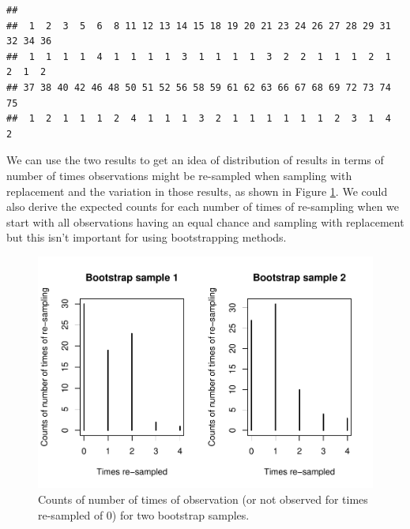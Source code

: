 \documentclass[]{book}
\newenvironment{Shaded}{\begin{snugshade}}{\end{snugshade}}
\newcommand{\KeywordTok}[1]{\textcolor[rgb]{0.13,0.29,0.53}{\textbf{#1}}}
\newcommand{\StringTok}[1]{\textcolor[rgb]{0.31,0.60,0.02}{#1}}
\newcommand{\OperatorTok}[1]{\textcolor[rgb]{0.81,0.36,0.00}{\textbf{#1}}}
\newcommand{\NormalTok}[1]{#1}
\begin{document}
\begin{Shaded}
\end{Shaded}

\begin{verbatim}
## 
##  1  2  3  5  6  8 11 12 13 14 15 18 19 20 21 23 24 26 27 28 29 31 32 34 36 
##  1  1  1  1  4  1  1  1  1  3  1  1  1  1  3  2  2  1  1  1  2  1  2  1  2 
## 37 38 40 42 46 48 50 51 52 56 58 59 61 62 63 66 67 68 69 72 73 74 75 
##  1  2  1  1  1  2  4  1  1  1  3  2  1  1  1  1  1  1  2  3  1  4  2
\end{verbatim}

We can use the two results to get an idea of distribution of results in
terms of number of times observations might be re-sampled when sampling
with replacement and the variation in those results, as shown in Figure
\ref{fig:Figure2-17}. We could also derive the expected counts for each
number of times of re-sampling when we start with all observations
having an equal chance and sampling with replacement but this isn't
important for using bootstrapping methods.




\begin{figure}
\centering
\includegraphics{GreenwoodBanner_files/figure-latex/Figure2-17-1.pdf}
\caption{\label{fig:Figure2-17}Counts of number of times of observation (or not observed
for times re-sampled of 0) for two bootstrap samples.}
\end{figure}
\end{document}
